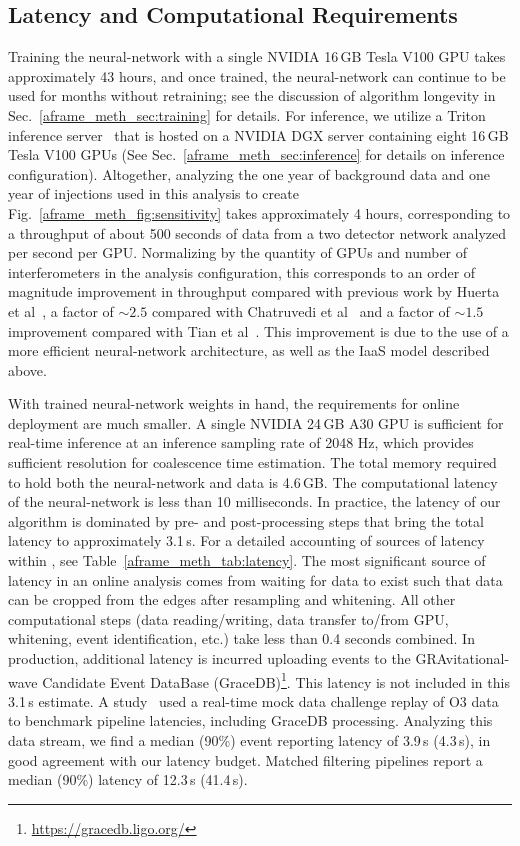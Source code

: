 \begin{refsection}
\section{Latency and Computational Requirements} \label{aframe_meth_sec:compute}
Training the neural-network with a single NVIDIA 16\,GB Tesla V100 GPU takes approximately 43 hours, and once trained, the neural-network can continue to be used for months without retraining; see the discussion of algorithm longevity in Sec.~\ref{aframe_meth_sec:training} for details. 
For inference, we utilize a Triton inference server~\cite{NVIDIA_Corporation_Triton_Inference_Server} that is hosted on a NVIDIA DGX server containing eight 16\,GB Tesla V100 GPUs (See Sec.~\ref{aframe_meth_sec:inference} for details on inference configuration). 
Altogether, analyzing the one year of background data and one year of injections used in this analysis to create Fig.~\ref{aframe_meth_fig:sensitivity} takes approximately 4 hours, corresponding to a throughput of about 500 seconds of data from a two detector network analyzed per second per GPU. 
Normalizing by the quantity of GPUs and number of interferometers in the analysis configuration, this corresponds to an order of magnitude improvement in throughput compared with previous work by Huerta et al~\cite{huerta2021}, a factor of $\sim2.5$ compared with Chatruvedi et al~\cite{Chaturvedi_2022} and a factor of $\sim1.5$ improvement compared with Tian et al~\cite{Tian_2024}. 
This improvement is due to the use of a more efficient neural-network architecture, as well as the IaaS model described above. 

With trained neural-network weights in hand, the requirements for online deployment are much smaller. 
A single NVIDIA 24\,GB A30 GPU is sufficient for real-time inference at an inference sampling rate of 2048 Hz, which provides sufficient resolution for coalescence time estimation. 
The total memory required to hold both the neural-network and data is 4.6\,GB. The computational latency of the neural-network is less than 10 milliseconds. 
In practice, the latency of our algorithm is dominated by pre- and post-processing steps that bring the total latency to approximately 3.1\,s. 
For a detailed accounting of sources of latency within \aframe, see Table~\ref{aframe_meth_tab:latency}. 
The most significant source of latency in an online analysis comes from waiting for data to exist such that data can be cropped from the edges after resampling and whitening. 
All other computational steps (data reading/writing, data transfer to/from GPU, whitening, event identification, etc.) take less than 0.4 seconds combined. 
In production, additional latency is incurred uploading events to the GRAvitational-wave Candidate Event
DataBase (GraceDB)\footnote{\url{https://gracedb.ligo.org/}}. 
This latency is not included in this 3.1\,s estimate. 
A study~\cite{chaudhary2023lowlatency} used a real-time mock data challenge replay of O3 data to benchmark pipeline latencies, including GraceDB processing. 
Analyzing this data stream, we find a median (90\%) event reporting latency of 3.9\,s (4.3\,s), in good agreement with our latency budget. 
Matched filtering pipelines report a median (90\%) latency of 12.3\,s (41.4\,s).


\end{refsection}
